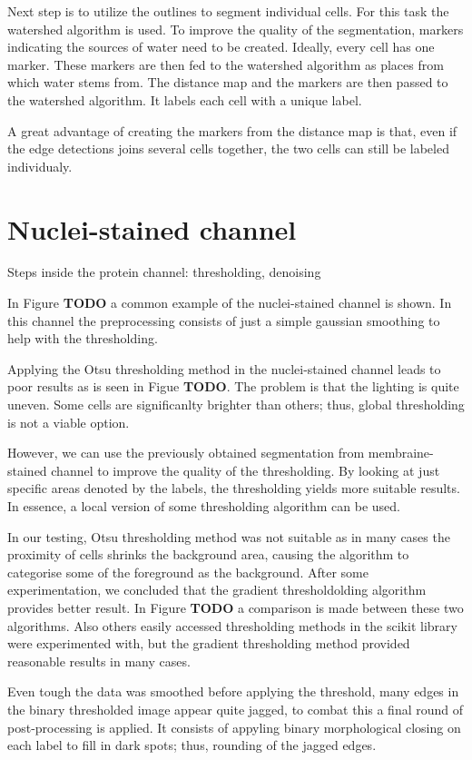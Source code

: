 \documentclass[
  digital,     %
  oneside,     %
  nosansbold,  %
  nocolorbold, %
  lof,         %
  lot,         %
]{fithesis4}
\begin{document}
Next step is to utilize the outlines to segment individual cells. For this task
the watershed algorithm is used. To improve the quality of the segmentation,
markers indicating the sources of water need to be created. Ideally, every cell
has one marker. These markers are then fed to the watershed algorithm as places
from which water stems from. %
The distance map and the markers are then passed to the
watershed algorithm. It labels each cell with a unique label.

A great advantage of creating the markers from the distance map is that, even if
the edge detections joins several cells together, the two cells can still be
labeled individualy.

\section{Nuclei-stained channel}

Steps inside the protein channel: thresholding, denoising

In Figure \textbf{TODO} a common example of the nuclei-stained channel is shown.
In this channel the preprocessing consists of just a simple gaussian smoothing
to help with the thresholding.

Applying the Otsu thresholding method in the nuclei-stained channel leads to
poor results as is seen in Figue \textbf{TODO}. The problem is that the lighting
is quite uneven. Some cells are significanlty brighter than others; thus, global
thresholding is not a viable option.

However, we can use the previously obtained segmentation from membraine-stained
channel to improve the quality of the thresholding. By looking at just specific
areas denoted by the labels, the thresholding yields more suitable results. In
essence, a local version of some thresholding algorithm can be used.

In our testing, Otsu thresholding method was not suitable as in many cases the
proximity of cells shrinks the background area, causing the algorithm to
categorise some of the foreground as the background. After some experimentation,
we concluded that the gradient thresholdolding algorithm provides better result.
In Figure \textbf{TODO} a comparison is made between these two algorithms. Also
others easily accessed thresholding methods in the scikit library were
experimented with, but the gradient thresholding method provided reasonable
results in many cases.

Even tough the data was smoothed before applying the threshold, many edges in
the binary thresholded image appear quite jagged, to combat this a final round
of post-processing is applied. It consists of appyling binary morphological
closing on each label to fill in dark spots; thus, rounding of the jagged edges.
\end{document}
